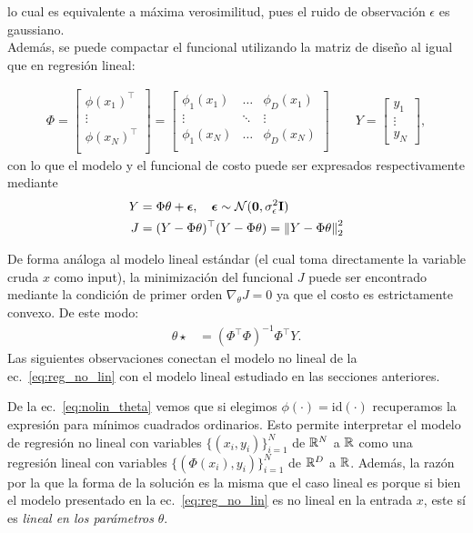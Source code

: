 lo cual es equivalente a máxima verosimilitud, pues el ruido de observación $\epsilon$ es gaussiano.\\

Además, se puede compactar el funcional utilizando la matriz de diseño al igual que en regresión lineal:

\begin{align}
    \Phi = 
    \left[ \begin{matrix} \phi(x_1)^\top\\
    \vdots \\
    \phi(x_N)^\top\\
    \end{matrix} \right]
     = \left[ \begin{matrix} \phi_1(x_1)& \ldots & \phi_D(x_1)\\
    \vdots & \ddots & \vdots \\
    \phi_1(x_N) & \ldots & \phi_D(x_N)\\
    \end{matrix} \right]
    \qquad
    Y = \left[ \begin{matrix} y_1 \\ \vdots \\ y_N \end{matrix} \right],
\end{align}
con lo que el modelo y el funcional de costo puede ser expresados respectivamente mediante
\begin{align}
    Y &= \Phi\theta + {\bm \epsilon},\quad {\bm \epsilon}\sim{\mathcal N}(\mathbf{0},\sigma_\epsilon^2\mathbf{I})\\
    J &= (Y-\Phi\theta)^\top(Y-\Phi\theta) = \left\lVert Y-\Phi\theta\right\rVert_2^2
\end{align}

De forma análoga al modelo lineal estándar (el cual toma directamente la variable cruda $x$ como input), la minimización del funcional $J$ puede  ser encontrado mediante la condición de primer orden $\nabla_\theta J=0$ ya que el costo es estrictamente convexo. De este modo:
\begin{align}
    \theta{\star}&= (\Phi^\top\Phi)^{-1}\Phi^\top Y\label{eq:nolin_theta}.
\end{align}
Las siguientes observaciones conectan el modelo no lineal de la ec.~\eqref{eq:reg_no_lin} con el modelo lineal estudiado en las secciones anteriores.


\begin{remark}
De la ec.~\eqref{eq:nolin_theta} vemos que si elegimos $\phi(\cdot) = \text{id}(\cdot)$ recuperamos la expresión para mínimos cuadrados ordinarios. Esto permite interpretar el modelo de regresión no lineal con variables $\{(x_i,y_i)\}_{i=1}^N$ de $\mathbb{R}^N$ a $\mathbb{R}$ como una regresión lineal con variables $\{(\Phi(x_i),y_i)\}_{i=1}^N$ de $\mathbb{R}^D$ a $\mathbb{R}$. Además, la razón por la que la forma de la solución es la misma que el caso lineal es porque si bien el modelo presentado en la ec.~\eqref{eq:reg_no_lin} es no  lineal en la entrada $x$, este sí es \emph{lineal en los parámetros} $\theta$.
\end{remark}

